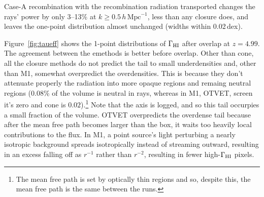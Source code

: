 \documentclass[iop]{openjournal}
\newcommand{\hmpc}{\,h\,\mathrm{Mpc}^{-1}}
\begin{document}
Case-A recombination
with the recombination radiation transported changes the rays' power by
only 3--13\% at $k\ge0.5\hmpc$, less than any closure does, and leaves the one-point distribution almost unchanged (widths within 0.02\,dex).


Figure~\ref{fig:taueff} shows the 1-point distributions of $\Gamma_{\rm HI}$ after overlap at $z=4.99$.  The agreement between the emethods is better before overlap.  Other than cone, all the closure methods do not predict the tail to small underdensities and, other than M1, somewhat overpredict the overdensities.  This is because they don't attenuate properly the radiation into more opaque regions and remaing neutral regions (0.08\% of the volume is neutral in rays, whereas in M1, OTVET, screen it's zero and cone is $0.02$).\footnote{The mean free path is set by optically thin regions and so, despite this, the mean free path is the same between the runs.}  Note that the axis is logged, and so this tail occurpies a small fraction of the volume. OTVET overpredicts the overdense tail because after the mean free path becomes larger than the box, it waits too heavily local contributions to the flux.  In M1, a point source’s light perturbing a nearly isotropic background spreads isotropically instead of streaming outward, resulting in an excess falling off as $r^{-1}$ rather than $r^{-2}$, resulting in fewer high-$\Gamma_{\rm HI}$ pixels.
\end{document}
